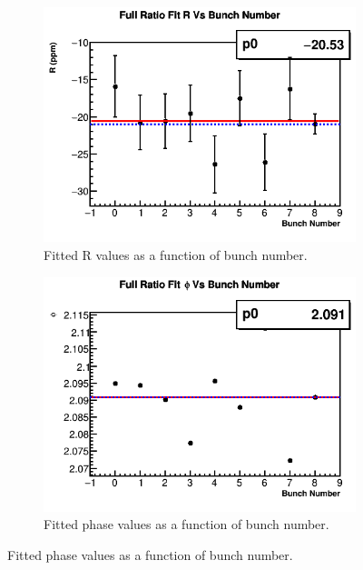 		\begin{figure}[]
		\centering
		    \begin{subfigure}[t]{0.4\textwidth}
			    \centering
				\includegraphics[width=\textwidth]{RatioCBO_R_Vs_BunchNum_Canv}
			    \caption{Fitted R values as a function of bunch number.}
		    \end{subfigure}
		    \hspace{4mm}
		    \begin{subfigure}[t]{0.4\textwidth}
			    \centering
				\includegraphics[width=\textwidth]{RatioCBO_phi_Vs_BunchNum_Canv}
			    \caption{Fitted \gmtwo phase values as a function of bunch number.}
		    \end{subfigure}%

\end{figure}
